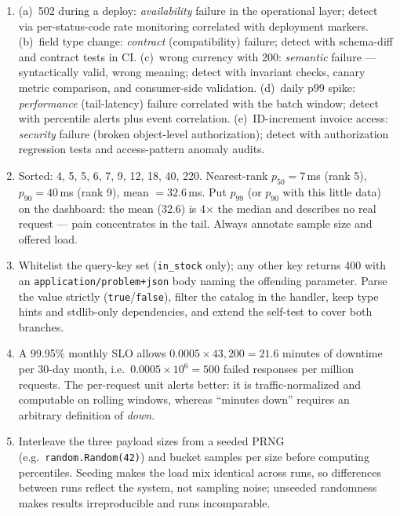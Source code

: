 \begin{enumerate}[label=\textbf{E0.\arabic*.}, leftmargin=3.2em]
  \item (a)~502 during a deploy: \emph{availability} failure in the
    operational layer; detect via per-status-code rate monitoring correlated
    with deployment markers. (b)~field type change: \emph{contract}
    (compatibility) failure; detect with schema-diff and contract tests in CI.
    (c)~wrong currency with 200: \emph{semantic} failure --- syntactically
    valid, wrong meaning; detect with invariant checks, canary metric
    comparison, and consumer-side validation. (d)~daily p99 spike:
    \emph{performance} (tail-latency) failure correlated with the batch
    window; detect with percentile alerts plus event correlation.
    (e)~ID-increment invoice access: \emph{security} failure (broken
    object-level authorization); detect with authorization regression tests
    and access-pattern anomaly audits.
  \item Sorted: 4, 5, 5, 6, 7, 9, 12, 18, 40, 220. Nearest-rank
    $p_{50}=7$\,ms (rank 5), $p_{90}=40$\,ms (rank 9), mean $=32.6$\,ms.
    Put $p_{99}$ (or $p_{90}$ with this little data) on the dashboard: the
    mean (32.6) is 4$\times$ the median and describes no real request ---
    pain concentrates in the tail. Always annotate sample size and offered
    load.
  \item Whitelist the query-key set (\texttt{in\_stock} only); any other key
    returns 400 with an \texttt{application/problem+json} body
    \cite{rfc9457} naming the offending parameter. Parse the value strictly
    (\texttt{true}/\texttt{false}), filter the catalog in the handler, keep
    type hints and stdlib-only dependencies, and extend the self-test to
    cover both branches.
  \item A 99.95\% monthly SLO allows $0.0005 \times 43{,}200 = 21.6$ minutes
    of downtime per 30-day month, i.e.\ $0.0005 \times 10^6 = 500$ failed
    responses per million requests. The per-request unit alerts better: it
    is traffic-normalized and computable on rolling windows, whereas
    ``minutes down'' requires an arbitrary definition of \emph{down}.
  \item Interleave the three payload sizes from a seeded PRNG (e.g.\
    \texttt{random.Random(42)}) and bucket samples per size before computing
    percentiles. Seeding makes the load mix identical across runs, so
    differences between runs reflect the system, not sampling noise;
    unseeded randomness makes results irreproducible and runs incomparable.

\end{enumerate}
